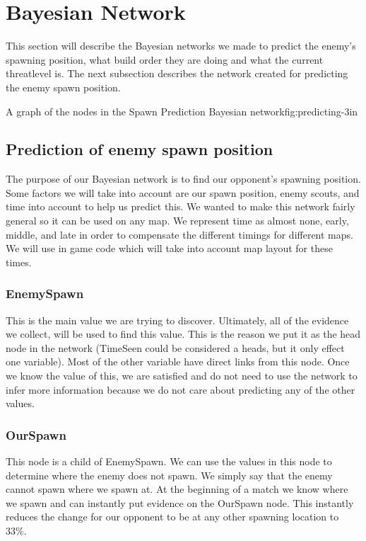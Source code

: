 \section{Bayesian Network}\label{bayesian_network}
This section will describe the Bayesian networks we made to predict the enemy's spawning position, what build order they are doing and what the current 
threatlevel is. The next subsection describes the network created for predicting the enemy spawn position.


			{A graph of the nodes in the Spawn Prediction Bayesian network}{fig:predicting}{-3in}

\subsection{Prediction of enemy spawn position}			 
			
The purpose of our Bayesian network is to find our opponent's spawning position. Some factors we will take into account are our spawn position, enemy scouts, and time into account to help us predict this. We wanted to make this network fairly general so it can be used on any  map. We represent time as almost none, early, middle, and late in order to compensate the different timings for different maps. We will use in game code which will take into account map layout for these times. 

\subsubsection*{EnemySpawn}
This is the main value we are trying to discover. Ultimately, all of the evidence we collect, will be used to find this value. This is the reason we put it as the head node in the network (TimeSeen could be considered a heads, but it only effect one variable). Most of the other variable have direct links from this node. Once we know the value of this, we are satisfied and do not need to use the network to infer more information because we do not care about predicting any of the other values.

\subsubsection*{OurSpawn}
This node is a child of EnemySpawn. We can use the values in this node to determine where the enemy does not spawn. We simply say that the enemy cannot spawn where we spawn at. At the beginning of a match we know where we spawn and can instantly put evidence on the OurSpawn node. This instantly reduces the change for our opponent to be at any other spawning location to 33\%.


